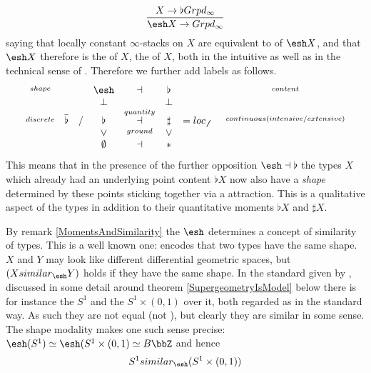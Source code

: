 \begin{displaymath}
\frac{X \to \flat Grpd_\infty}{\esh  X\to Grpd_\infty}
\end{displaymath}
saying that locally constant $\infty$-stacks on $X$ are equivalent to  of $\esh  X$, and that $\esh  X$ therefore is the  of $X$, the  of $X$, both in the intuitive as well as in the technical sense of .
Therefore we further add labels as follows.
\begin{displaymath}
\itexarray{
\stackrel{shape}{} && & \esh  &\stackrel{}{\dashv}& \flat &  & & \stackrel{content}{}
\\
&& & \bot &\stackrel{}{}& \bot
\\
\stackrel{discrete}{} &\overline{\flat}& / & \flat &\stackrel{quantity}{\dashv}& \sharp & = loc_{\not\not} &   & \stackrel{continuous (intensive/extensive)}{}
\\
&& & \vee &\stackrel{ground}{}& \vee
\\
&& & \emptyset &\dashv& \ast &
}
\end{displaymath}
This means that in the presence of the further opposition $\esh  \dashv \flat$ the types $X$ which already had an underlying point content $\flat X$ now also have a \emph{shape} determined by these points sticking together via a  attraction. This is a qualitative aspect of the types in addition to their quantitative moments $\flat X$ and $\sharp X$.
\begin{example}
\label{ShapeAsAConceptOfSimilarity}\hypertarget{ShapeAsAConceptOfSimilarity}{}
By remark \ref{MomentsAndSimilarity} the  $\esh $ determines a concept of similarity of types. This is a well known one:  encodes that two types have the same shape. $X$ and $Y$ may look like different differential geometric spaces, but $(X  similar_{\esh } Y)$ holds if they have the same shape.
In the standard  given by , discussed in some detail around theorem \ref{SupergeometryIsModel} below there is for instance the  $S^1$ and the  $S^1 \times (0,1)$ over it, both regarded as  in the standard way. As such they are not equal (not ), but clearly they are similar in some sense. The shape modality makes one such sense precise: $\esh  (S^1) \simeq \esh  (S^1 \times (0,1) \simeq B \bbZ$ and hence
\begin{displaymath}
S^1  similar_{\esh }  (S^1 \times (0,1))
\end{displaymath}
\end{example}

